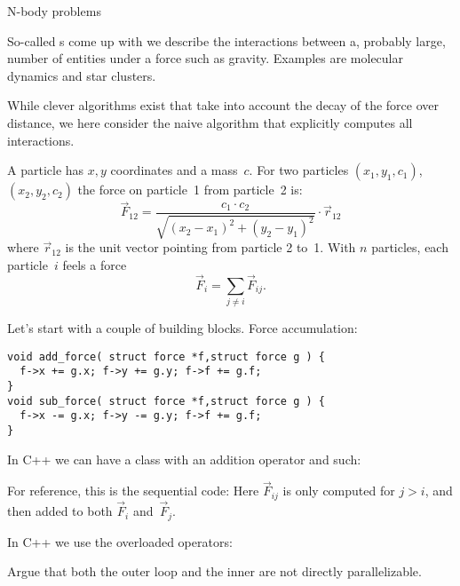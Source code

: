 
 {N-body problems}

So-called s come up with
we describe the interactions between a,
probably large,
number of entities under a force such as gravity.
Examples are molecular dynamics and star clusters.

While clever algorithms exist that take into account the
decay of the force over distance,
we here consider the naive algorithm that
explicitly computes all interactions.

A particle has $x,y$ coordinates and a mass~$c$.
For two particles $(x_1,y_1,c_1)$, $(x_2,y_2,c_2)$
the force on particle~1 from particle~2 is:
\[ \overrightarrow F_{12} = \frac{c_1\cdot c_2}{\sqrt{ (x_2-x_1)^2+(y_2-y_1)^2 }} \cdot \overrightarrow r_{12} \]
where $\overrightarrow r_{12}$ is the unit vector pointing from particle 2 to~1.
With $n$ particles, each particle~$i$ feels a force
\[ \overrightarrow F_i = \sum_{j\not=i} \overrightarrow F_{ij}.\]

Let's start with a couple of building blocks.
Force accumulation:
\begin{lstlisting}
void add_force( struct force *f,struct force g ) {
  f->x += g.x; f->y += g.y; f->f += g.f;
}
void sub_force( struct force *f,struct force g ) {
  f->x -= g.x; f->y -= g.y; f->f += g.f;
}
\end{lstlisting}

In C++ we can have a class with an addition operator and such:
%

For reference, this is the sequential code:
Here $\overrightarrow F_{ij}$ is only computed for $j>i$, and then
added to both $\overrightarrow F_i$ and~$\overrightarrow F_j$.

In C++ we use the overloaded operators:
%

\begin{exercise}
  Argue that both the outer loop and the inner are not directly parallelizable.
\end{exercise}

